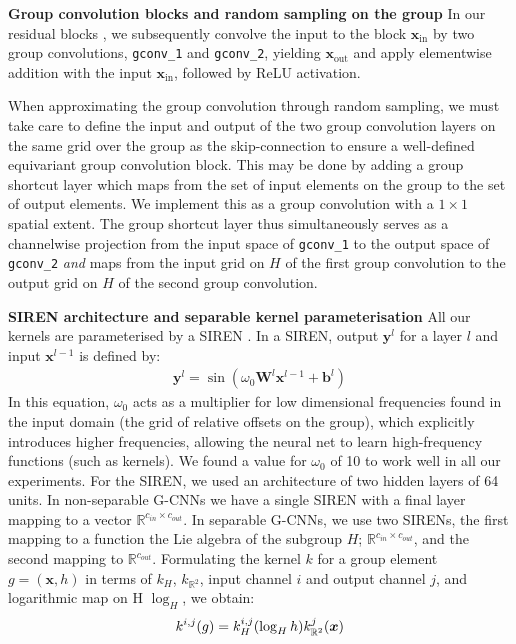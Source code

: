 \documentclass[nohyperref]{article}
\theoremstyle{plain}
\theoremstyle{definition}
\theoremstyle{remark}
\newcommand{\R}{\mathbb{R}}
\begin{document}
\textbf{Group convolution blocks and random sampling on the group} In our residual blocks \citep{he2016deep}, we subsequently convolve the input to the block $\boldsymbol{x}_{\text{in}}$ by two group convolutions, \texttt{gconv\_1} and \texttt{gconv\_2}, yielding $\boldsymbol{x}_{\text{out}}$ and apply elementwise addition with the input $\boldsymbol{x}_{\text{in}}$, followed by ReLU activation.

When approximating the group convolution through random sampling, we must take care to define the input and output of the two group convolution layers on the same grid over the group as the skip-connection to ensure a well-defined equivariant group convolution block. This may be done by adding a group shortcut layer which maps from the set of input elements on the group to the set of output elements. We implement this as a group convolution with a $1\times 1$ spatial extent. The group shortcut layer thus simultaneously serves as a channelwise projection from the input space of \texttt{gconv\_1} to the output space of \texttt{gconv\_2} \textit{and} maps from the input grid on $H$ of the first group convolution to the output grid on $H$ of the second group convolution.

\textbf{SIREN architecture and separable kernel parameterisation} All our kernels are parameterised by a SIREN  \citep{sitzmann2020implicit}. In a SIREN, output $\boldsymbol{y}^l$ for a layer $l$ and input $\boldsymbol{x}^{l-1}$ is defined by:
\begin{align}
    \boldsymbol{y}^l = \sin(\omega_0 \boldsymbol{W}^l \boldsymbol{x}^{l-1} + \boldsymbol{b}^l)
\end{align}
In this equation, $\omega_0$ acts as a multiplier for low dimensional frequencies found in the input domain (the grid of relative offsets on the group), which explicitly introduces higher frequencies, allowing the neural net to learn high-frequency functions (such as kernels). We found a value for $\omega_0$ of 10 to work well in all our experiments. For the SIREN, we used an architecture of two hidden layers of 64 units. In non-separable G-CNNs we have a single SIREN with a final layer mapping to a vector $\R^{c_{in} \times c_{out}}$. In separable G-CNNs, we use two SIRENs, the first mapping to a function the Lie algebra of the subgroup $H$; $\R^{c_{in} \times c_{out}}$, and the second mapping to $\R^{c_{out}}$. Formulating the kernel $k$ for a group element $g=(\boldsymbol{x}, h)$ in terms of $k_H$, $k_{\mathbb{R}^2}$, input channel $i$ and output channel $j$, and logarithmic map on H $\log_H$, we obtain:
\begin{equation}
    k^{i,j} (g) = k_H^{i,j}(\log_H h)k_{\mathbb{R}^2}^{j}(\boldsymbol{x}) \\
\end{equation}
\end{document}

